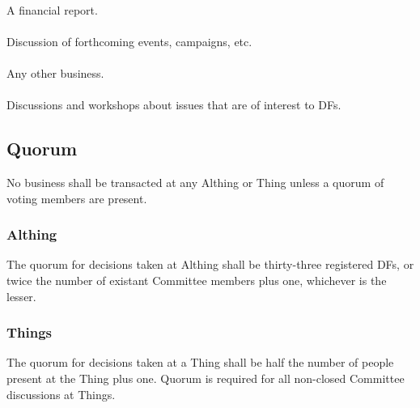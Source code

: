 \documentclass[a4paper, 12pt]{report}
\begin{document}
\paragraph{}
A financial report.
\paragraph{}
Discussion of forthcoming events, campaigns, etc. 
\paragraph{}
Any other business.
\paragraph{}
Discussions and workshops about issues that are of interest to DFs. 

\subsection{Quorum}
No business shall be transacted at any Althing or Thing unless a quorum of voting
members are present.
\subsubsection{Althing} The quorum for decisions taken at Althing shall be thirty-three registered DFs, or twice the number of existant Committee members plus one, whichever is the lesser.
\subsubsection{Things} The quorum for decisions taken at a Thing shall be half the number of people present at the Thing plus one. Quorum is required for all non-closed Committee discussions at Things.
\end{document}
